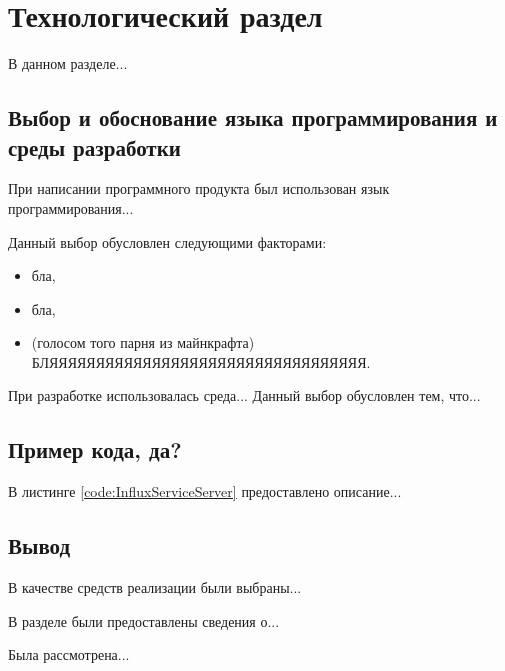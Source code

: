 \section{Технологический раздел}
В данном разделе...

\subsection{Выбор и обоснование языка программирования и среды разработки}
При написании программного продукта был использован язык программирования... 

Данный выбор обусловлен следующими факторами:
\begin{itemize}
\item бла,
\item бла,
\item (голосом того парня из майнкрафта) БЛЯЯЯЯЯЯЯЯЯЯЯЯЯЯЯЯЯЯЯЯЯЯЯЯЯЯЯЯЯЯЯЯЯЯ.
\end{itemize}

При разработке использовалась среда... Данный выбор обусловлен тем, что...

\subsection{Пример кода, да?}
В листинге \ref{code:InfluxServiceServer} предоставлено описание...



\subsection*{Вывод}
В качестве средств реализации были выбраны...

В разделе были предоставлены сведения о...

Была рассмотрена...
